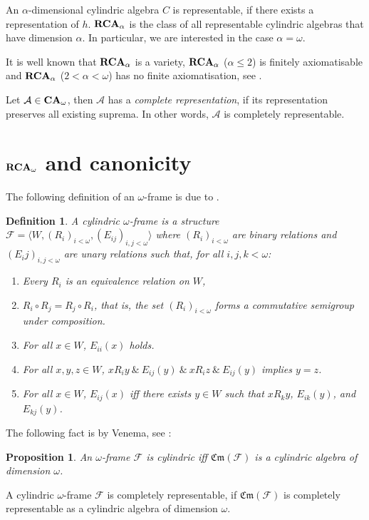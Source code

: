 \documentclass[a4paper]{article}
\theoremstyle{defin}
\newtheorem{defin}{Definition}
\theoremstyle{theorem}
\theoremstyle{prop}
\newtheorem{prop}{Proposition}
\theoremstyle{lemma}
\theoremstyle{fact}
\theoremstyle{ex}
\theoremstyle{col}
\begin{document}
An $\alpha$-dimensional cylindric algebra $C$ is representable, if there exists a representation of $h$.
${\bf RCA}_{\alpha}$ is the class of all representable cylindric algebras that have dimension $\alpha$. In particular, we are interested in the case $\alpha = \omega$.

It is well known that ${\bf RCA}_{\alpha}$ is a variety, ${\bf RCA}_{\alpha}$ ($\alpha \leq 2$) is finitely axiomatisable and ${\bf RCA}_{\alpha}$ ($2 < \alpha < \omega$) has no finite axiomatisation, see \cite{Henkin1988-HENCAP-4}.

Let $\mathcal{A} \in {\bf CA}_{\omega}$, then $\mathcal{A}$ has a \emph{complete representation}, if its representation preserves all existing suprema. In other words, $\mathcal{A}$ is completely representable.

\section{${\bf RCA}_{\omega}$ and canonicity}

The following definition of an $\omega$-frame is due to \cite{Venema2013}.
\begin{defin}
  A cylindric $\omega$-frame is a structure $\mathcal{F} = \langle W, (R_i)_{i < \omega}, (E_{ij})_{i, j < \omega} \rangle$ where $(R_i)_{i < \omega}$ are binary relations and $(E_ij)_{i, j < \omega}$ are unary relations such that, for all $i, j, k < \omega$:
  \begin{enumerate}
  \item Every $R_i$ is an equivalence relation on $W$,
  \item $R_i \circ R_j = R_j \circ R_i$, that is, the set $(R_i)_{i < \omega}$ forms a commutative semigroup under composition.
  \item For all $x \in W$, $E_{ii}(x)$ holds.
  \item For all $x, y, z \in W$, $x R_i y \: \& \: E_{ij}(y) \: \& \: x R_i z \: \& \: E_{ij}(y)$ implies $y = z$.
  \item For all $x \in W$, $E_{ij}(x)$ iff there exists $y \in W$ such that $x R_k y$, $E_{ik}(y)$, and $E_{kj}(y)$.
  \end{enumerate}
\end{defin}

The following fact is by Venema, see \cite[Proposition 2.1.5]{Venema2013}:
\begin{prop}
An $\omega$-frame $\mathcal{F}$ is cylindric iff $\mathfrak{Cm}(\mathcal{F})$ is a cylindric algebra of dimension $\omega$.
\end{prop}
A cylindric $\omega$-frame $\mathcal{F}$ is completely representable, if $\mathfrak{Cm}(\mathcal{F})$ is completely representable as a cylindric algebra of dimension $\omega$.
\end{document}
